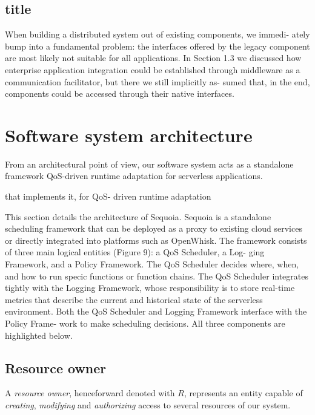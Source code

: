 \documentclass[12pt,a4paper]{report}
\begin{document}
\subsection{title}

When building a distributed system out of existing components, we immedi-
ately bump into a fundamental problem: the interfaces offered by the legacy
component are most likely not suitable for all applications. In Section 1.3 we
discussed how enterprise application integration could be established through
middleware as a communication facilitator, but there we still implicitly as-
sumed that, in the end, components could be accessed through their native
interfaces.


\section{Software system architecture}

From an architectural point of view, our software system acts as a standalone framework QoS-driven runtime adaptation for serverless applications.



 that implements it, for QoS-
driven runtime adaptation 


This section details the architecture of Sequoia. Sequoia is a
standalone scheduling framework that can be deployed as a
proxy to existing cloud services or directly integrated into
platforms such as OpenWhisk. The framework consists of
three main logical entities (Figure 9): a QoS Scheduler, a Log-
ging Framework, and a Policy Framework. The QoS Scheduler
decides where, when, and how to run specic functions or
function chains. The QoS Scheduler integrates tightly with
the Logging Framework, whose responsibility is to store
real-time metrics that describe the current and historical
state of the serverless environment. Both the QoS Scheduler
and Logging Framework interface with the Policy Frame-
work to make scheduling decisions. All three components
are highlighted below.






\subsection{Resource owner}

A \textit{resource owner}, henceforward denoted with $R$, represents an entity capable of \textit{creating}, \textit{modifying} and \textit{authorizing} access to several resources of our system.
\end{document}
